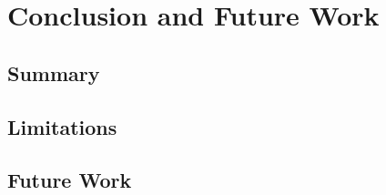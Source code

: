 
\chapter{Conclusion and Future Work}\label{ch:conclusion}

\section{Summary}\label{sec:summary}


\section{Limitations}\label{sec:limitations}


\section{Future Work}\label{sec:future_work}

%
%
